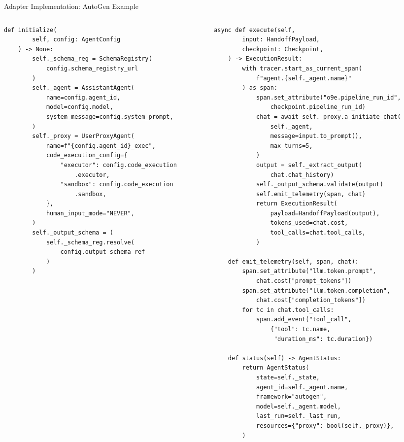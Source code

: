 \begin{frame}[fragile]{Adapter Implementation: AutoGen Example}
\begin{columns}[T]
\begin{column}{0.52\textwidth}
\begin{lstlisting}[style=pythonstyle,basicstyle=\ttfamily\fontsize{3.3}{4}\selectfont,title={\tiny\bfseries opencollage/adapters/autogen\_adapter.py}]
    def initialize(
        self, config: AgentConfig
    ) -> None:
        self._schema_reg = SchemaRegistry(
            config.schema_registry_url
        )
        self._agent = AssistantAgent(
            name=config.agent_id,
            model=config.model,
            system_message=config.system_prompt,
        )
        self._proxy = UserProxyAgent(
            name=f"{config.agent_id}_exec",
            code_execution_config={
                "executor": config.code_execution
                    .executor,
                "sandbox": config.code_execution
                    .sandbox,
            },
            human_input_mode="NEVER",
        )
        self._output_schema = (
            self._schema_reg.resolve(
                config.output_schema_ref
            )
        )
      \end{lstlisting}
    \end{column}
    \begin{column}{0.48\textwidth}
      \begin{lstlisting}[style=pythonstyle,basicstyle=\ttfamily\fontsize{3.3}{4}\selectfont,title={\tiny\bfseries execute() and emit\_telemetry()}]
    async def execute(self,
        input: HandoffPayload,
        checkpoint: Checkpoint,
    ) -> ExecutionResult:
        with tracer.start_as_current_span(
            f"agent.{self._agent.name}"
        ) as span:
            span.set_attribute("o9e.pipeline_run_id",
                checkpoint.pipeline_run_id)
            chat = await self._proxy.a_initiate_chat(
                self._agent,
                message=input.to_prompt(),
                max_turns=5,
            )
            output = self._extract_output(
                chat.chat_history)
            self._output_schema.validate(output)
            self.emit_telemetry(span, chat)
            return ExecutionResult(
                payload=HandoffPayload(output),
                tokens_used=chat.cost,
                tool_calls=chat.tool_calls,
            )

    def emit_telemetry(self, span, chat):
        span.set_attribute("llm.token.prompt",
            chat.cost["prompt_tokens"])
        span.set_attribute("llm.token.completion",
            chat.cost["completion_tokens"])
        for tc in chat.tool_calls:
            span.add_event("tool_call",
                {"tool": tc.name,
                 "duration_ms": tc.duration})

    def status(self) -> AgentStatus:
        return AgentStatus(
            state=self._state,
            agent_id=self._agent.name,
            framework="autogen",
            model=self._agent.model,
            last_run=self._last_run,
            resources={"proxy": bool(self._proxy)},
        )
      \end{lstlisting}
    \end{column}
  \end{columns}
\end{frame}


